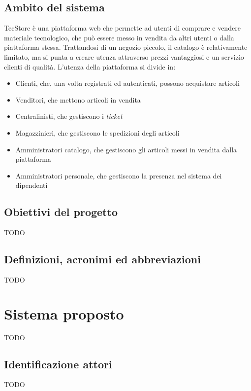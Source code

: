 \documentclass[12pt,a4paper]{article}
\begin{document}
\subsection{Ambito del sistema}
TecStore è una piattaforma web che permette ad utenti di comprare e vendere materiale tecnologico, che può essere messo in vendita da altri utenti o dalla piattaforma stessa. Trattandosi di un negozio piccolo, il catalogo è relativamente limitato, ma si punta a creare utenza attraverso prezzi vantaggiosi e un servizio clienti di qualità.
L'utenza della piattaforma si divide in:
\begin{itemize}
\item Clienti, che, una volta registrati ed autenticati, possono acquistare articoli
\item Venditori, che mettono articoli in vendita
\item Centralinisti, che gestiscono i \emph{ticket}
\item Magazzinieri, che gestiscono le spedizioni degli articoli
\item Amministratori catalogo, che gestiscono gli articoli messi in vendita dalla piattaforma
\item Amministratori personale, che gestiscono la presenza nel sistema dei dipendenti
\end{itemize}

\subsection{Obiettivi del progetto}
 TODO

\subsection{Definizioni, acronimi ed abbreviazioni}
 TODO

\section{Sistema proposto}
 TODO
 
\subsection{Identificazione attori}
 TODO
 
\end{document}
